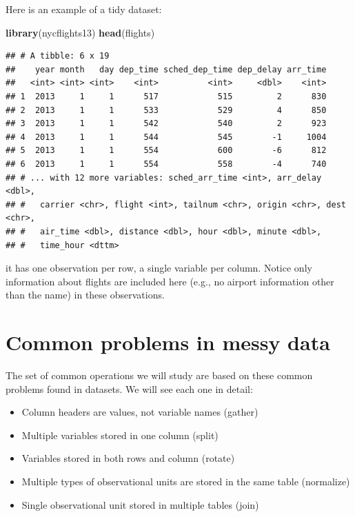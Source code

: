 \documentclass[]{book}
\newenvironment{Shaded}{\begin{snugshade}}{\end{snugshade}}
\newcommand{\KeywordTok}[1]{\textcolor[rgb]{0.13,0.29,0.53}{\textbf{#1}}}
\newcommand{\NormalTok}[1]{#1}
\providecommand{\tightlist}{%
  \setlength{\itemsep}{0pt}\setlength{\parskip}{0pt}}
\theoremstyle{definition}
\theoremstyle{definition}
\theoremstyle{remark}
\begin{document}
Here is an example of a tidy dataset:

\begin{Shaded}
\begin{Highlighting}[]
\KeywordTok{library}\NormalTok{(nycflights13)}
\KeywordTok{head}\NormalTok{(flights)}
\end{Highlighting}
\end{Shaded}

\begin{verbatim}
## # A tibble: 6 x 19
##    year month   day dep_time sched_dep_time dep_delay arr_time
##   <int> <int> <int>    <int>          <int>     <dbl>    <int>
## 1  2013     1     1      517            515         2      830
## 2  2013     1     1      533            529         4      850
## 3  2013     1     1      542            540         2      923
## 4  2013     1     1      544            545        -1     1004
## 5  2013     1     1      554            600        -6      812
## 6  2013     1     1      554            558        -4      740
## # ... with 12 more variables: sched_arr_time <int>, arr_delay <dbl>,
## #   carrier <chr>, flight <int>, tailnum <chr>, origin <chr>, dest <chr>,
## #   air_time <dbl>, distance <dbl>, hour <dbl>, minute <dbl>,
## #   time_hour <dttm>
\end{verbatim}

it has one observation per row, a single variable per column. Notice
only information about flights are included here (e.g., no airport
information other than the name) in these observations.

\section{Common problems in messy
data}\label{common-problems-in-messy-data}

The set of common operations we will study are based on these common
problems found in datasets. We will see each one in detail:

\begin{itemize}
\tightlist
\item
  Column headers are values, not variable names (gather)\\
\item
  Multiple variables stored in one column (split)\\
\item
  Variables stored in both rows and column (rotate)\\
\item
  Multiple types of observational units are stored in the same table
  (normalize)\\
\item
  Single observational unit stored in multiple tables (join)
\end{itemize}
\end{document}
